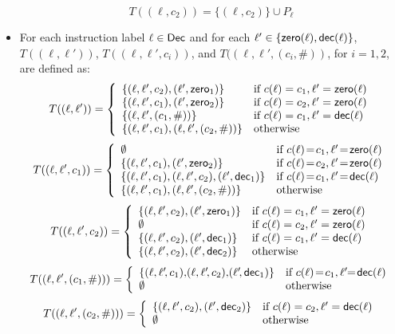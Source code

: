 \begin{itemize}
\[
T((\ell,c_2))   =  \{(\ell,c_2)\}\cup P_\ell %
\]
%
\item For each  instruction label $\ell\in\mathsf{Dec}$ and for each $\ell'\in \{{\mathsf{zero}}(\ell),{\mathsf{dec}}(\ell)\}$, $T((\ell,\ell'))$, $T((\ell,\ell',c_i))$, and $T((\ell,\ell',(c_i,\#))$, for $i=1,2$, are defined as:
%
 \[
    T((\ell,\ell'))  =  \left\{
      \begin{array}{ll}
        \{(\ell,\ell',c_2),(\ell',{\mathsf{zero}}_1)\}
        &    \text{if }  c(\ell) =c_1 , \ell'={\mathsf{zero}}(\ell)
        \\
        \{(\ell,\ell',c_1),(\ell',{\mathsf{zero}}_2)\}
        &    \text{if }  c(\ell) =c_2 , \ell'={\mathsf{zero}}(\ell)
        \\
        \{(\ell,\ell',(c_1,\#))\}
        &    \text{if }  c(\ell) =c_1 , \ell'={\mathsf{dec}}(\ell)
        \\
        \{(\ell,\ell', c_1),(\ell,\ell',(c_2,\#))\}
        &    \text{otherwise }
       \end{array}
    \right.
  \]
  \[
    T((\ell,\ell',c_1))  =  \left\{
      \begin{array}{ll}
        \emptyset
        &    \text{if }  c(\ell)\! =\!c_1 , \ell'\!=\!\zero(\ell)
        \\
        \{(\ell,\ell',c_1),(\ell',\zero_2)\}
        &    \text{if }  c(\ell)\! =\!c_2 , \ell'\!=\!\zero(\ell)
        \\
        \{(\ell,\ell',c_1),(\ell,\ell',c_2),(\ell',\dec_1)\}
        &    \text{if }  c(\ell)\! =\!c_1 , \ell'\!=\!\dec(\ell)
        \\
        \{(\ell,\ell', c_1),(\ell,\ell',(c_2,\#))\}
        &    \text{otherwise }
       \end{array}
    \right.
  \]
  \[
    T((\ell,\ell',c_2))  =  \left\{
      \begin{array}{ll}
      \{(\ell,\ell',c_2),(\ell',{\mathsf{zero}}_1)\}
        &    \text{if }  c(\ell) =c_1 , \ell'={\mathsf{zero}}(\ell)
        \\
       \emptyset
        &    \text{if }  c(\ell) =c_2 , \ell'={\mathsf{zero}}(\ell)
        \\
        \{ (\ell,\ell',c_2),(\ell',{\mathsf{dec}}_1)\}
        &    \text{if }  c(\ell) =c_1 , \ell'={\mathsf{dec}}(\ell)
        \\
        \{ (\ell,\ell',c_2),(\ell',{\mathsf{dec}}_2)\}
        &    \text{otherwise }
       \end{array}
    \right.
  \]
   \[
    T((\ell,\ell',(c_1,\#)))  =  \left\{
      \begin{array}{ll}
        \{(\ell,\ell'\!,c_1),\!(\ell,\ell'\!,c_2),\!(\ell'\!,\dec_1)\}
        &    \text{if }  c(\ell) \!=\! c_1 , \ell'\!\!=\!\dec(\ell)
        \\
         \emptyset
        &    \text{otherwise }
       \end{array}
    \right.
  \]
   \[
    T((\ell,\ell',(c_2,\#)))  =  \left\{
      \begin{array}{ll}
        \{ (\ell,\ell',c_2),(\ell',{\mathsf{dec}}_2)\}
        &    \text{if }  c(\ell) = c_2 , \ell'={\mathsf{dec}}(\ell)
        \\
         \emptyset
        &    \text{otherwise }
       \end{array}
    \right.
  \]



\end{itemize}
